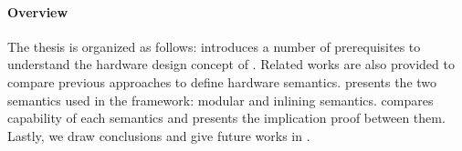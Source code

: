 \paragraph{Overview}

The thesis is organized as follows: 
introduces a number of prerequisites to understand the hardware design
concept of \Bluespec{}. Related works are also provided to compare
previous approaches to define hardware semantics.
 presents the two semantics used in the
\Kami{} framework: modular and inlining
semantics.  compares capability of each
semantics and presents the implication proof between them. Lastly, we
draw conclusions and give future works in .


